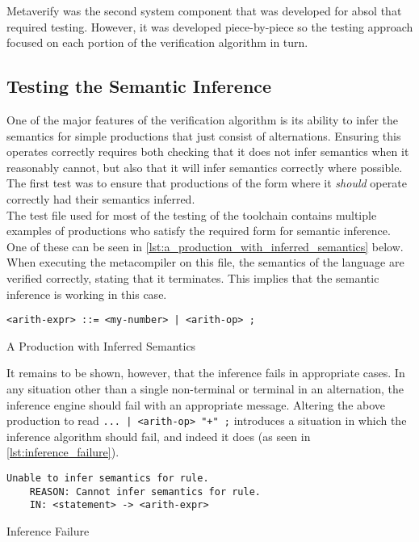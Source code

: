 Metaverify was the second system component that was developed for \gls{absol} that required testing.
However, it was developed piece-by-piece so the testing approach focused on each portion of the verification algorithm in turn. 

\subsection{Testing the Semantic Inference} %
\label{sub:testing_the_semantic_inference}
One of the major features of the verification algorithm is its ability to infer the semantics for simple productions that just consist of alternations. 
Ensuring this operates correctly requires both checking that it does not infer semantics when it reasonably cannot, but also that it will infer semantics correctly where possible.
The first test was to ensure that productions of the form where it \textit{should} operate correctly had their semantics inferred. \\

The test file used for most of the testing of the toolchain contains multiple examples of productions who satisfy the required form for semantic inference. 
One of these can be seen in \autoref{lst:a_production_with_inferred_semantics} below. 
When executing the metacompiler on this file, the semantics of the language are verified correctly, stating that it terminates.
This implies that the semantic inference is working in this case. 

\begin{listing}[!htb]
\begin{verbatim}
<arith-expr> ::= <my-number> | <arith-op> ;
\end{verbatim}
\caption{A Production with Inferred Semantics}
\label{lst:a_production_with_inferred_semantics}
\end{listing}

It remains to be shown, however, that the inference fails in appropriate cases.
In any situation other than a single non-terminal or terminal in an alternation, the inference engine should fail with an appropriate message. 
Altering the above production to read \texttt{... | <arith-op> "+" ;} introduces a situation in which the inference algorithm should fail, and indeed it does (as seen in \autoref{lst:inference_failure}).

\begin{listing}[!htb]
\begin{verbatim}
Unable to infer semantics for rule.
    REASON: Cannot infer semantics for rule.
    IN: <statement> -> <arith-expr>
\end{verbatim}
\caption{Inference Failure}
\label{lst:inference_failure}
\end{listing}

